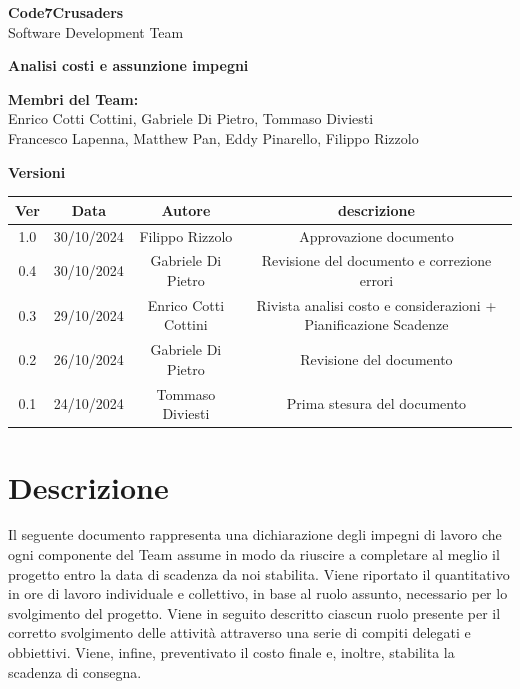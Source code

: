 \documentclass{article}
\begin{document}
\begin{titlepage}
    {\Huge \textbf{Code7Crusaders}}\\
    \vspace{0.5cm}
    {\Large Software Development Team}\\
    \vspace{2cm}
    
    \large \textbf{Analisi costi e assunzione impegni}
    \vspace{5cm}

    \textbf{Membri del Team:}\\
    Enrico Cotti Cottini, Gabriele Di Pietro, Tommaso Diviesti \\
    Francesco Lapenna, Matthew Pan, Eddy Pinarello, Filippo Rizzolo \\
    \vspace{0.5cm}
    
    \vspace{1cm}
\end{titlepage}

\newpage
\begin{center}
    \textbf{Versioni}
    \\
    \vspace{0.3cm}
    \begin{tabular}{|c|c|c|c|}
        \hline
        \textbf{Ver} & \textbf{Data} & \textbf{Autore} & \textbf{descrizione}\\
        \hline
        1.0 & 30/10/2024 & Filippo Rizzolo & Approvazione documento \\ 
        \hline
        0.4 & 30/10/2024 & Gabriele Di Pietro & Revisione del documento e correzione errori \\
        \hline
        0.3 & 29/10/2024 & Enrico Cotti Cottini & Rivista analisi costo e considerazioni + Pianificazione Scadenze  \\
        \hline
        0.2 & 26/10/2024 & Gabriele Di Pietro & Revisione del documento \\
        \hline
        0.1 & 24/10/2024 & Tommaso Diviesti & Prima stesura del documento \\
        \hline
    \end{tabular}
\end{center}

\newpage
\tableofcontents
\newpage

\section{Descrizione}
Il seguente documento rappresenta una dichiarazione degli impegni di lavoro che ogni componente del Team assume in modo da 
riuscire a completare al meglio il progetto entro la data di scadenza da noi stabilita. Viene riportato il quantitativo in 
ore di lavoro individuale e collettivo, in base al ruolo assunto, necessario per lo svolgimento del progetto. Viene in seguito 
descritto ciascun ruolo presente per il corretto svolgimento delle attività attraverso una serie di compiti delegati e obbiettivi. 
Viene, infine, preventivato il costo finale e, inoltre, stabilita la scadenza di consegna.
\newpage
\end{document}
